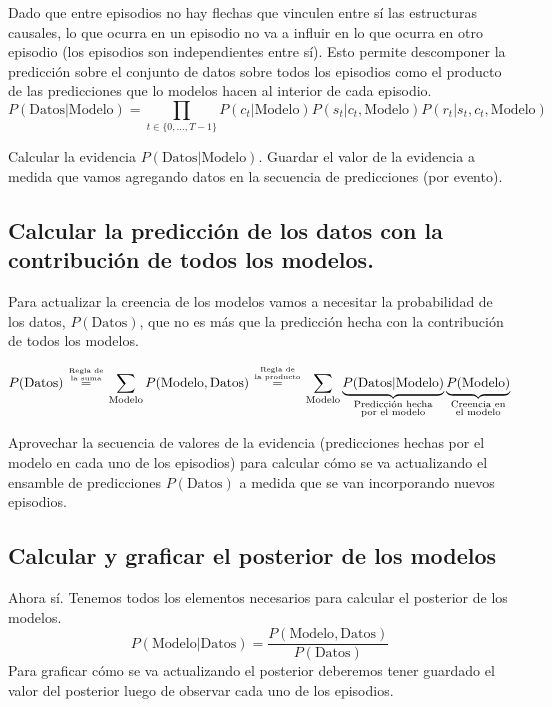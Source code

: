 \documentclass[a4paper,10pt]{article}
\begin{document}
Dado que entre episodios no hay flechas que vinculen entre sí las estructuras causales, lo que ocurra en un episodio no va a influir en lo que ocurra en otro episodio (los episodios son independientes entre sí).
%
Esto permite descomponer la predicción sobre el conjunto de datos sobre todos los episodios como el producto de las predicciones que lo modelos hacen al interior de cada episodio.
%
$$P(\text{Datos} |\text{Modelo}) = \prod_{t\in \{0,\dots,T-1 \}} P(c_t|\text{Modelo})P(s_t|c_t,\text{Modelo})P(r_t|s_t,c_t,\text{Modelo})  $$


Calcular la evidencia $P(\text{Datos} |\text{Modelo})$.
%
Guardar el valor de la evidencia a medida que vamos agregando datos en la secuencia de predicciones (por evento).

\subsection{Calcular la predicción de los datos con la contribución de todos los modelos.}

Para actualizar la creencia de los modelos vamos a necesitar la probabilidad de los datos, $P(\text{Datos})$, que no es más que la predicción hecha con la contribución de todos los modelos.

$$P(\text{Datos}) \overset{\genfrac{}{}{0pt}{}{\text{Regla de}}{\text{la suma}} }{=} \sum_{\text{Modelo}} P(\text{Modelo},\text{Datos}) \overset{\genfrac{}{}{0pt}{}{\text{Regla de}}{\text{la producto}} }{=} \sum_{\text{Modelo}} \underbrace{P(\text{Datos}|\text{Modelo})}_{\hfrac{\text{\scriptsize Predicción hecha}}{\text{\scriptsize por el modelo}}} \underbrace{P(\text{Modelo})}_{\hfrac{\text{\scriptsize Creencia en}}{\text{\scriptsize el modelo}}}$$

Aprovechar la secuencia de valores de la evidencia (predicciones hechas por el modelo en cada uno de los episodios) para calcular cómo se va actualizando el ensamble de predicciones $P(\text{Datos})$ a medida que se van incorporando nuevos episodios.

\subsection{Calcular y graficar el posterior de los modelos}

Ahora sí.
%
Tenemos todos los elementos necesarios para calcular el posterior de los modelos.
%
$$ P(\text{Modelo}|\text{Datos}) = \frac{P(\text{Modelo}, \text{Datos})}{P(\text{Datos})} $$
%
Para graficar cómo se va actualizando el posterior deberemos tener guardado el valor del posterior luego de observar cada uno de los episodios.
\end{document}
